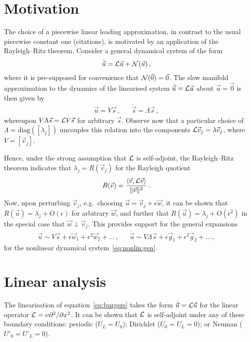 \documentclass[12pt,a4paper]{article}
\begin{document}
\section{Motivation}\label{sec:motive}
The choice of a piecewise linear leading approximation, in contrast to the usual piecewise constant one
(citations), is motivated by an application of the Rayleigh--Ritz theorem.
Consider a general dynamical system of the form
\begin{eqnarray}
\dot{\vec u} = {\cal L}{\vec u}+{\cal N}({\vec u})\,,
\label{eq:nonlin:gen}
\end{eqnarray}
where it is pre-supposed for convenience that ${\cal N}({\vec 0})={\vec 0}$. 
The slow manifold approximation to the dynamics of the linearised system
$\dot{{\vec u}}={\cal L}{\vec u}$ about ${\vec u}={\vec 0}$ is then given by
\begin{eqnarray}
{\vec u} = V{\vec s}\,, && \dot{{\vec s}} = \Lambda{\vec s}\,,
\end{eqnarray}
whereupon $V\Lambda{\vec s}={\cal L}V{\vec s}$ for arbitrary ${\vec s}$.
Observe now that a particular choice of $\Lambda=\mbox{diag}(\left[\lambda_j\right])$ uncouples this relation into the components
${\cal L}{\vec v}_j=\lambda{\vec v}_j$, where $V=\left[{\vec v}_j\right]$.

Hence, under the strong assumption that ${\cal L}$ is self-adjoint, the Rayleigh--Ritz theorem indicates that
$\lambda_j = R({\vec v}_j)$ for the Rayleigh quotient 
\[ R({\vec v}) = \frac{\langle{\vec v},{\cal L}{\vec v}\rangle}{\|{\vec v}\|^2}\,.\]
Now, upon perturbing ${\vec v}_j$, e.g.\ choosing ${\vec u}={\vec v}_j+\epsilon{\vec w}$, it can be shown
that $R({\vec u})=\lambda_j+O(\epsilon)$ for arbitrary ${\vec w}$, and further that
 $R({\vec u})=\lambda_j+O(\epsilon^2)$ in the special case that ${\vec w}\perp{\vec v}_j$.
This provides support for the general expansions
\begin{eqnarray}
{\vec u} \sim V{\vec s}+\epsilon{\vec w}_1+\epsilon^2{\vec w}_2+\ldots\,,
&& 
\dot{\vec u} \sim V\Lambda{\vec s}+\epsilon{\vec g}_1+\epsilon^2{\vec g}_2+\ldots\,,
\end{eqnarray}
for the nonlinear dynamical system~\eqref{eq:nonlin:gen}.

\section{Linear analysis}\label{sec:lin}
The linearisation of equation~\eqref{eq:burgers} takes the form $\dot{\vec u}={\cal L}{\vec u}$ for the linear operator
${\cal L}=\nu\DD x{}$. It can be shown that ${\cal L}$ is self-adjoint under any of these boundary conditions:
periodic ($U_L=U_0$); Dirichlet ($U_0=U_L=0$); or Neuman ($U'_0=U'_L=0$).
\end{document}
